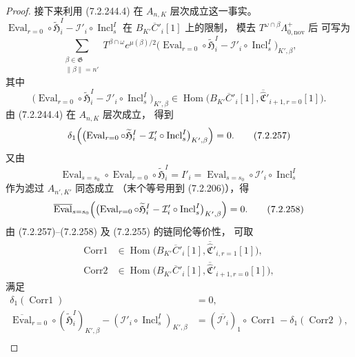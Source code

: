 \begin{proof}
接下来利用 (7.2.244.4)
在 $A_{n,K}$ 层次成立这一事实。
$\operatorname{Eval}_{r=0}\circ
\widetilde{\mathfrak H}_i^I
-\mathcal I'_i\circ
\operatorname{Incl}_s^I$
在 $B_{K'}\overline C'_i[1]$ 上的限制，
模去 $T^{\omega\cap\beta}
\Lambda^+_{0,\mathrm{nov}}$ 后
可写为
\[
\sum_{\substack{\beta\in\mathfrak G\\
\lVert\beta\rVert=n'}}
T^{\beta\cap\omega}e^{\mu(\beta)/2}
\bigl(
\operatorname{Eval}_{r=0}\circ
\widetilde{\mathfrak H}_i^I
-\mathcal I'_i\circ
\operatorname{Incl}_s^I
\bigr)_{K',\beta},
\]
其中
\[
\bigl(
\operatorname{Eval}_{r=0}\circ
\widetilde{\mathfrak H}_i^I
-\mathcal I'_i\circ
\operatorname{Incl}_s^I
\bigr)_{K',\beta}
\in\operatorname{Hom}\bigl(
B_{K'}\overline C'_i[1],
\overline{\widehat{\mathfrak C}}'_{i+1,r=0}[1]
\bigr).
\]
由 (7.2.244.4) 在 $A_{n,K}$ 层次成立，
得到
\begin{equation}
\delta_1\Bigl(
\bigl(\operatorname{Eval}_{r=0}\circ
\widetilde{\mathfrak H}_i^I
-\mathcal I'_i\circ
\operatorname{Incl}_s^I\bigr)_{K',\beta}
\Bigr)=0.
\tag{7.2.257}\label{eq:7-2-257}
\end{equation}
又由
\[
\operatorname{Eval}_{s=s_0}\circ
\operatorname{Eval}_{r=0}\circ
\widetilde{\mathfrak H}_i^I
=I'_i
=\operatorname{Eval}_{s=s_0}\circ
\mathcal I'_i\circ
\operatorname{Incl}_s^I
\]
作为滤过 $A_{n',K'}$ 同态成立
（末个等号用到 (7.2.206)），得
\begin{equation}
\overline{\operatorname{Eval}}_{s=s_0}
\Bigl(
\bigl(\operatorname{Eval}_{r=0}\circ
\widetilde{\mathfrak H}_i^I
-\mathcal I'_i\circ
\operatorname{Incl}_s^I\bigr)_{K',\beta}
\Bigr)=0.
\tag{7.2.258}\label{eq:7-2-258}
\end{equation}
由 (7.2.257)--(7.2.258)
及 (7.2.255) 的链同伦等价性，
可取
\[
\begin{aligned}
\operatorname{Corr1}
&\in\operatorname{Hom}\bigl(
B_{K'}\overline C'_i[1],
\overline{\widehat{\mathfrak C}}'_{i,r=1}[1]
\bigr),\\
\operatorname{Corr2}
&\in\operatorname{Hom}\bigl(
B_{K'}\overline C'_i[1],
\overline{\widehat{\mathfrak C}}'_{i+1,r=0}[1]
\bigr),
\end{aligned}
\]
满足
\begin{align}
\delta_1(\operatorname{Corr1})&=0,
\tag{7.2.259.1}\label{eq:7-2-259-1}\\
\overline{\operatorname{Eval}}_{r=0}\circ
(\widetilde{\mathfrak H}_i^I)_{K',\beta}
-(\mathcal I'_i\circ
\operatorname{Incl}_s^I)_{K',\beta}
&=(\overline{\mathcal I'_i})_1\circ
\operatorname{Corr1}
-\delta_1(\operatorname{Corr2}),
\tag{7.2.259.2}\label{eq:7-2-259-2}\\

\end{align}
\end{proof}
